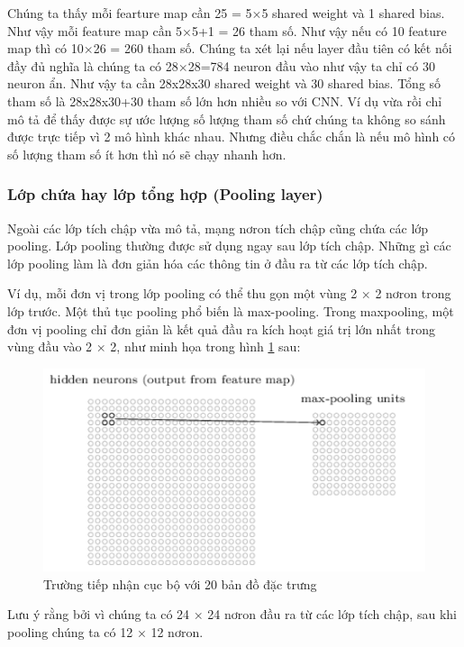 Chúng ta thấy mỗi fearture map cần 25 = 5×5 shared weight và 1 shared bias. Như vậy mỗi feature map cần 5×5+1 = 26 tham số. Như vậy nếu có 10 feature map thì có 10×26 = 260 tham số. Chúng ta xét lại nếu layer đầu tiên có kết nối đầy đủ nghĩa là chúng ta có 28×28=784 neuron đầu vào như vậy ta chỉ có 30 neuron ẩn. Như vậy ta cần 28x28x30 shared weight và 30 shared bias. Tổng số tham số là 
28x28x30+30 tham số lớn hơn nhiều so với CNN. Ví dụ vừa rồi chỉ mô tả để thấy được sự ước lượng số lượng tham số chứ chúng ta không so sánh được trực tiếp vì 2 mô hình khác nhau. Nhưng điều chắc chắn là nếu mô hình có số lượng tham số ít hơn thì nó sẽ chạy nhanh hơn.

\subsubsection{Lớp chứa hay lớp tổng hợp (Pooling layer)}
Ngoài các lớp tích chập vừa mô tả, mạng nơron tích chập cũng chứa các lớp pooling. Lớp pooling thường được sử dụng ngay sau lớp tích chập. Những gì các lớp pooling làm là đơn giản hóa các thông tin ở đầu ra từ các lớp tích chập. 

Ví dụ, mỗi đơn vị trong lớp pooling có thể thu gọn một vùng 2 × 2 nơron trong lớp trước. Một thủ tục pooling phổ biến là max-pooling. Trong maxpooling, một đơn vị pooling chỉ đơn giản là kết quả đầu ra kích hoạt giá trị lớn nhất trong vùng đầu vào 2 × 2, như minh họa trong hình \ref{fig:cnnmaxpooling22} sau: 
\begin{figure}[H]
	\centering
	\includegraphics[width=0.8\linewidth]{images/cnnmaxpooling22.png}
	\caption{Trường tiếp nhận cục bộ với 20 bản đồ đặc trưng}
	\label{fig:cnnmaxpooling22}
\end{figure}
Lưu ý rằng bởi vì chúng ta có 24 × 24 nơron đầu ra từ các lớp tích chập, sau khi pooling chúng ta có 12 × 12 nơron.

